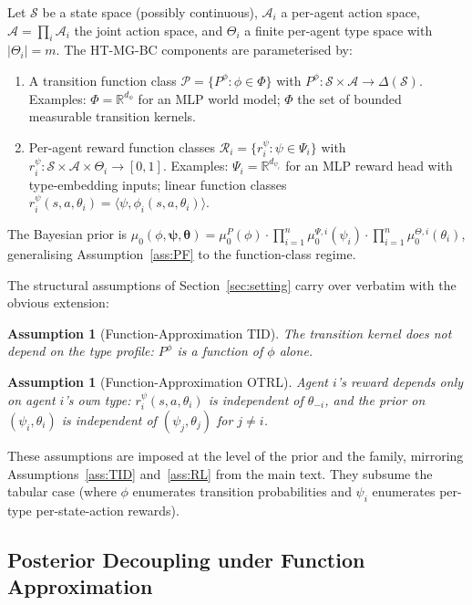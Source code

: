 \documentclass{article}
\newtheorem{assumption}[theorem]{Assumption}
\begin{document}
Let $\mathcal{S}$ be a state space (possibly continuous), $\mathcal{A}_i$ a per-agent action space, $\mathcal{A} = \prod_i \mathcal{A}_i$ the joint action space, and $\Theta_i$ a finite per-agent type space with $|\Theta_i| = m$. The HT-MG-BC components are parameterised by:
\begin{enumerate}
\item A transition function class $\mathcal{P} = \{P^\phi: \phi \in \Phi\}$ with $P^\phi: \mathcal{S} \times \mathcal{A} \to \Delta(\mathcal{S})$. Examples: $\Phi = \mathbb{R}^{d_\phi}$ for an MLP world model; $\Phi$ the set of bounded measurable transition kernels.
\item Per-agent reward function classes $\mathcal{R}_i = \{r_i^{\psi}: \psi \in \Psi_i\}$ with $r_i^\psi: \mathcal{S} \times \mathcal{A} \times \Theta_i \to [0, 1]$. Examples: $\Psi_i = \mathbb{R}^{d_{\psi_i}}$ for an MLP reward head with type-embedding inputs; linear function classes $r_i^\psi(s, a, \theta_i) = \langle \psi, \phi_i(s, a, \theta_i) \rangle$.
\end{enumerate}
The Bayesian prior is $\mu_0(\phi, \boldsymbol{\psi}, \boldsymbol{\theta}) = \mu_0^P(\phi) \cdot \prod_{i=1}^n \mu_0^{\Psi, i}(\psi_i) \cdot \prod_{i=1}^n \mu_0^{\Theta, i}(\theta_i)$, generalising Assumption~\ref{ass:PF} to the function-class regime.

The structural assumptions of Section~\ref{sec:setting} carry over verbatim with the obvious extension:

\begin{assumption}[Function-Approximation TID]
\label{ass:tid-fa}
The transition kernel does not depend on the type profile: $P^\phi$ is a function of $\phi$ alone.
\end{assumption}

\begin{assumption}[Function-Approximation OTRL]
\label{ass:otrl-fa}
Agent $i$'s reward depends only on agent $i$'s own type: $r_i^\psi(s, a, \theta_i)$ is independent of $\theta_{-i}$, and the prior on $(\psi_i, \theta_i)$ is independent of $(\psi_j, \theta_j)$ for $j \neq i$.
\end{assumption}

These assumptions are imposed at the level of the prior and the family, mirroring Assumptions~\ref{ass:TID} and~\ref{ass:RL} from the main text. They subsume the tabular case (where $\phi$ enumerates transition probabilities and $\psi_i$ enumerates per-type per-state-action rewards).

\subsection{Posterior Decoupling under Function Approximation}
\label{app:fa-decoupling}
\end{document}
